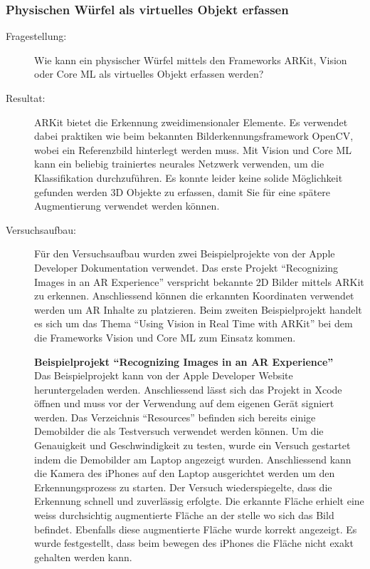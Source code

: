 \subsubsection{Physischen Würfel als virtuelles Objekt erfassen}\label{subsub:prot-physische-wuerfel}
\begin{description}
	\item[Fragestellung:] Wie kann ein physischer Würfel mittels den Frameworks ARKit, Vision oder Core ML als virtuelles Objekt erfassen werden?
	\item[Resultat:] ARKit bietet die Erkennung zweidimensionaler Elemente. Es verwendet dabei praktiken wie beim bekannten Bilderkennungsframework OpenCV, wobei ein Referenzbild hinterlegt werden muss.
	Mit Vision und Core ML kann ein beliebig trainiertes neurales Netzwerk verwenden, um die Klassifikation durchzuführen. Es konnte leider keine solide Möglichkeit gefunden werden 3D Objekte zu erfassen, damit Sie für eine spätere Augmentierung verwendet werden können. 
	\item[Versuchsaufbau:] Für den Versuchsaufbau wurden zwei Beispielprojekte von der Apple Developer Dokumentation verwendet. Das erste Projekt "`Recognizing Images in an AR Experience"' \cite{arkit-recognize-images} verspricht bekannte 2D Bilder mittels ARKit zu erkennen. Anschliessend können die erkannten Koordinaten verwendet werden um AR Inhalte zu platzieren.
	Beim zweiten Beispielprojekt handelt es sich um das Thema "`Using Vision in Real Time with ARKit"' \cite{vision-real-time-with-arkit} bei dem die Frameworks Vision und Core ML zum Einsatz kommen.

	\textbf{Beispielprojekt "`Recognizing Images in an AR Experience"'} \\
	Das Beispielprojekt kann von der Apple Developer Website heruntergeladen werden. Anschliessend lässt sich das Projekt in Xcode öffnen und muss vor der Verwendung auf dem eigenen Gerät signiert werden. Das Verzeichnis "`Resources"' befinden sich bereits einige Demobilder die als Testversuch verwendet werden können. Um die Genauigkeit und Geschwindigkeit zu testen, wurde ein Versuch gestartet indem die Demobilder am Laptop angezeigt wurden. Anschliessend kann die Kamera des iPhones auf den Laptop ausgerichtet werden um den Erkennungsprozess zu starten. Der Versuch wiederspiegelte, dass die Erkennung schnell und zuverlässig erfolgte. Die erkannte Fläche erhielt eine weiss durchsichtig augmentierte Fläche an der stelle wo sich das Bild befindet. Ebenfalls diese augmentierte Fläche wurde korrekt angezeigt. Es wurde festgestellt, dass beim bewegen des iPhones die Fläche nicht exakt gehalten werden kann.


\end{description}
